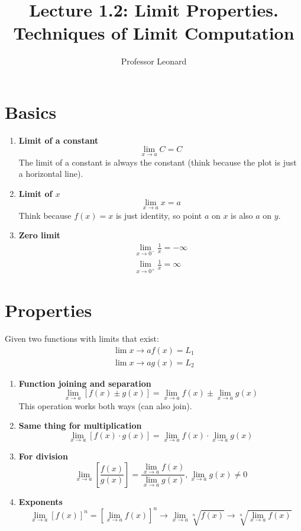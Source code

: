\documentclass{article}
\begin{document}
\title{Lecture 1.2: Limit Properties. Techniques of Limit Computation}
\author{Professor Leonard}
\maketitle

\section{Basics}

\begin{enumerate}
    \item \textbf{Limit of a constant}
$$
\lim_{x \to a} C = C
$$
The limit of a constant is always the constant (think because the plot is just a
horizontal line).

    \item \textbf{Limit of $x$}
        $$
        \lim_{x\to a} x = a
        $$
        Think because $f(x) = x$ is just identity, so point $a$ on $x$ is also $a$ on $y$.

    \item \textbf{Zero limit}
        \begin{align*}
            \lim_{x\to 0^-} \frac{1}{x}= -\infty\\
            \lim_{x\to 0^+} \frac{1}{x} = \infty
        \end{align*}

\end{enumerate}

\section{Properties}

Given two functions with limits that exist:
\begin{align*}
    \lim{x\to a}f(x) = L_1\\
    \lim{x\to a} g(x) = L_2
\end{align*}

\begin{enumerate}
    \item \textbf{Function joining and separation}
        $$
        \lim_{x\to a} [f(x) \pm g(x)] = \lim_{x\to a}f(x) \pm \lim_{x\to a}g(x)
        $$
        This operation works both ways (can also join).

    \item \textbf{Same thing for multiplication}
        $$
        \lim_{x\to a} [f(x) \cdot g(x)] = \lim_{x\to a}f(x) \cdot \lim_{x\to a}g(x)
        $$
    \item \textbf{For division}
        $$
        \lim_{x\to a} \left[ \frac{f(x)}{g(x)} \right] = \frac{\lim_{x\to
        a}f(x)}{\lim_{x\to a}g(x)}, \lim_{x\to a}g(x) \neq 0
        $$

    \item \textbf{Exponents}
        $$
        \lim_{x\to a}[f(x)]^n = \left[\lim_{x\to a} f(x) \right]^n \rightarrow \lim_{x\to
        a} \sqrt[n]{f(x)} \rightarrow \sqrt[n]{\lim_{x\to a}f(x)}
        $$


\end{enumerate}
\end{document}
